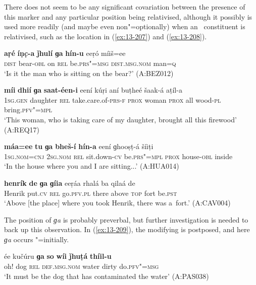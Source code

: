 There does not seem to be any significant covariation between the presence of this marker and any particular position being relativised, although it possibly is used more readily (and maybe even non"=optionally) when an~ constituent is relativised, such as the location in (\ref{ex:13-207}) and (\ref{ex:13-208}). 

\begin{exe}
\ex
\label{ex:13-205}
\gll \textbf{aṛé} \textbf{íṇc̣-a} \textbf{ǰhulí} \textbf{ɡa} \textbf{hín-u} eeṛó  míiš=ee \\
\textsc{dist} bear-\textsc{obl} on \textsc{rel} be.\textsc{prs"=msg} \textsc{dist.msg.nom}   man=\textsc{q} \\
\glt `Is it the man who is sitting on the bear?' (A:BEZ012)

\ex
\label{ex:13-206}
\gll \textbf{míi} \textbf{dhií} \textbf{ɡa} \textbf{saat-éen-i} eení kúṛi  aní buṭheé šaak-á aṭíl-a \\
\textsc{1sg.gen} daughter \textsc{rel} take.care.of-\textsc{prs-f} \textsc{prox} woman \textsc{prox} all wood-\textsc{pl} bring.\textsc{pfv"=mpl} \\
\glt `This woman, who is taking care of my daughter, brought all this firewood' (A:REQ17)

\ex
\label{ex:13-207}
\gll \textbf{máa=ee} \textbf{tu} \textbf{ɡa} \textbf{bheš-í} \textbf{hín-a}  eení ɡhooṣṭ-á šíiṭi\\
\textsc{1sg.nom=cnj} \textsc{2sg.nom} \textsc{rel} sit.down-\textsc{cv} be.\textsc{prs"=mpl} \textsc{prox} house-\textsc{obl} inside\\
\glt `In the house where you and I are sitting...' (A:HUA014)

\ex
\label{ex:13-208}
\gll \label{bkm:Ref190845659}\textbf{henrík} \textbf{de} \textbf{ɡa} \textbf{ɡíia} eeṛáa rhalá ba  qilaá de \\
Henrik put.\textsc{cv} \textsc{rel} go.\textsc{pfv.pl}  there above \textsc{top} fort be.\textsc{pst } \\
\glt `Above [the place] where you took Henrik, there was a~fort.' (A:CAV004) 
\end{exe}

The position of \textit{ɡa} is probably preverbal, but further investigation is needed to back up this observation. In (\ref{ex:13-209}), the modifying  is postposed, and here \textit{ɡa} occurs "=initially.

\begin{exe}
\ex
\label{ex:13-209}
\gll ée kučúru \textbf{ɡa} \textbf{so} \textbf{wíi} \textbf{ǰhuṭá} \textbf{thíil-u}  \\
oh! dog \textsc{rel} \textsc{def.msg.nom} water dirty do.\textsc{pfv"=msg} \\
\glt `It must be the dog that has contaminated the water' (A:PAS038) 
\end{exe}

